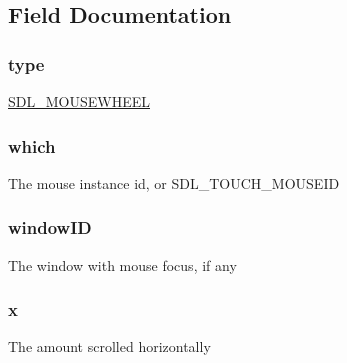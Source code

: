 \subsection{Field Documentation}
\subsubsection[{\texorpdfstring{type}{type}}]{ type}\hypertarget{struct_s_d_l___mouse_wheel_event_aa40a9b05c3154032b9f2d7220e9f08dc}{}\label{struct_s_d_l___mouse_wheel_event_aa40a9b05c3154032b9f2d7220e9f08dc}
\hyperlink{_s_d_l__events_8h_a3b589e89be6b35c02e0dd34a55f3fccaa63135c2e0aea2286f05066f3c0bc5c4e}{S\+D\+L\+\_\+\+M\+O\+U\+S\+E\+W\+H\+E\+EL} 
\subsubsection[{\texorpdfstring{which}{which}}]{ which}\hypertarget{struct_s_d_l___mouse_wheel_event_abd239700243abe3b42bfee05bbf65fa7}{}\label{struct_s_d_l___mouse_wheel_event_abd239700243abe3b42bfee05bbf65fa7}
The mouse instance id, or S\+D\+L\+\_\+\+T\+O\+U\+C\+H\+\_\+\+M\+O\+U\+S\+E\+ID 
\subsubsection[{\texorpdfstring{window\+ID}{windowID}}]{ window\+ID}\hypertarget{struct_s_d_l___mouse_wheel_event_a78d9995068d6f40cd78bb8db7351b0a1}{}\label{struct_s_d_l___mouse_wheel_event_a78d9995068d6f40cd78bb8db7351b0a1}
The window with mouse focus, if any 
\subsubsection[{\texorpdfstring{x}{x}}]{ x}\hypertarget{struct_s_d_l___mouse_wheel_event_a133a64253d58ecff038d427c70b5b0aa}{}\label{struct_s_d_l___mouse_wheel_event_a133a64253d58ecff038d427c70b5b0aa}
The amount scrolled horizontally 
